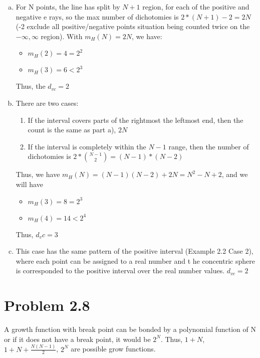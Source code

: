 \documentclass{article}
\def\math#1{$#1$}
\begin{document}
\begin{enumerate}[a)]
    \item For N points, the line has split by \math{N + 1} region, for each of the positive and negative e rays, so the max number of dichotomies is \math{2 * (N + 1) - 2 = 2N} (-2 exclude all positive/negative points situation being counted twice on the \math{-\infty, \infty} region). With \math{m_H(N) = 2N}, we have:
        \begin{itemize}
            \item \math{m_H(2) = 4 = 2^2}
            \item \math{m_H(3) = 6 < 2^3}
        \end{itemize}
    Thus, the \math{d_{vc} = 2}
    \item There are two cases:
        \begin{enumerate}[1)]
            \item If the interval covers parts of the rightmost the leftmost end, then the count is the same as part a), \math{2N}
            \item If the interval is completely within the \math{N - 1} range, then the number of dichotomies is \math{2 * { N - 1 \choose 2 } = (N - 1) * (N - 2)}
        \end{enumerate}
        Thus, we have \math{m_H(N) = (N - 1)(N - 2) + 2N = N^2 - N + 2}, and we will have
        \begin{itemize}
            \item \math{m_H(3) = 8 = 2^3}
            \item \math{m_H(4) = 14 < 2^4}
        \end{itemize}
        Thus, \math{d_vc = 3}
    \item This case has the same pattern of the positive interval (Example 2.2 Case 2), where each point can be assigned to a real number and t he concentric sphere is corresponded to the positive interval over the real number values. \math{d_{vc} = 2}
\end{enumerate}

\section{Problem 2.8}

A growth function with break point can be bonded by a polynomial function of N or if it does not have a break point, it would be \math{2^N}. Thus, \math{1 + N}, \math{1 + N + \frac{N(N - 1)}{2}}, \math{2^N} are possible grow functions. 
\end{document}
